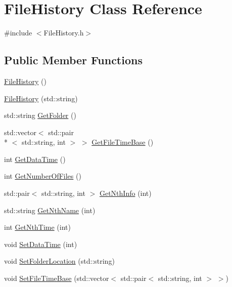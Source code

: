 \hypertarget{classFileHistory}{\section{File\-History Class Reference}
\label{classFileHistory}
}


{\ttfamily \#include $<$File\-History.\-h$>$}

\subsection*{Public Member Functions}
\begin{DoxyCompactItemize}
\item 
\hyperlink{classFileHistory_a841820a546629b57a1c779b6d1fd5b01}{File\-History} ()
\item 
\hyperlink{classFileHistory_aa310b68872f8288b9da8a93494d8f525}{File\-History} (std\-::string)
\item 
std\-::string \hyperlink{classFileHistory_abd579dba633254deeec041baca818dd4}{Get\-Folder} ()
\item 
std\-::vector$<$ std\-::pair\\*
$<$ std\-::string, int $>$ $>$ \hyperlink{classFileHistory_a3d1903578989dfc361949bc15a838916}{Get\-File\-Time\-Base} ()
\item 
int \hyperlink{classFileHistory_aef61a14e143844cc16549984ab58a6da}{Get\-Data\-Time} ()
\item 
int \hyperlink{classFileHistory_af21dcb68d35717715e21d9121fda54c3}{Get\-Number\-Of\-Files} ()
\item 
std\-::pair$<$ std\-::string, int $>$ \hyperlink{classFileHistory_a23e62c1567a2a2ede14e028c917a867d}{Get\-Nth\-Info} (int)
\item 
std\-::string \hyperlink{classFileHistory_afeea4550ec1a66b978b69e8baccd3ab5}{Get\-Nth\-Name} (int)
\item 
int \hyperlink{classFileHistory_abc507e5a818fde5c73608d1126eb43bf}{Get\-Nth\-Time} (int)
\item 
void \hyperlink{classFileHistory_a111c5a71865ac87637e1bb22c0fa7a2c}{Set\-Data\-Time} (int)
\item 
void \hyperlink{classFileHistory_a22a0e9aa366f2f8cd0c748cce6d16e19}{Set\-Folder\-Location} (std\-::string)
\item 
void \hyperlink{classFileHistory_af78b8284b8188ff9c29d875e4e630ba1}{Set\-File\-Time\-Base} (std\-::vector$<$ std\-::pair$<$ std\-::string, int $>$ $>$)
\item 

\end{DoxyCompactItemize}

